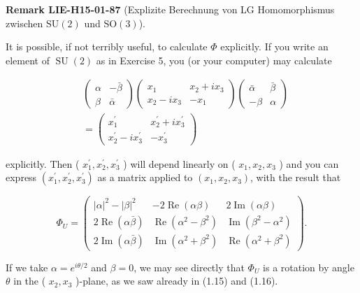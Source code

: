 \documentclass[10pt, letterpaper]{article}
\newcommand{\SO}{\mathrm{SO}}
\newcommand{\SU}{\mathrm{SU}}
\newcommand{\CustomHeading}[3]{%
  \par\medskip\noindent%
  \textbf{#1 #2} \textnormal{(#3)}.\enskip%
}
\newenvironment{REM}[2]{\begin{unitbox}\CustomHeading{Remark}{#1}{#2}}{\end{unitbox}}
\begin{document}
\begin{REM}{LIE-H15-01-87}{Explizite Berechnung von LG Homomorphismus zwischen $\SU(2)$ und $\SO(3)$}
It is possible, if not terribly useful, to calculate $\Phi$ explicitly. If you write an element of $\operatorname{SU}(2)$ as in Exercise 5, you (or your computer) may calculate

$$
\begin{aligned}
& \left(\begin{array}{cc}
\alpha & -\bar{\beta} \\
\beta & \bar{\alpha}
\end{array}\right)\left(\begin{array}{cc}
x_{1} & x_{2}+i x_{3} \\
x_{2}-i x_{3} & -x_{1}
\end{array}\right)\left(\begin{array}{rc}
\bar{\alpha} & \bar{\beta} \\
-\beta & \alpha
\end{array}\right) \\
& =\left(\begin{array}{cc}
x_{1}^{\prime} & x_{2}^{\prime}+i x_{3}^{\prime} \\
x_{2}^{\prime}-i x_{3}^{\prime} & -x_{3}^{\prime}
\end{array}\right)
\end{aligned}
$$

explicitly. Then ( $x_{1}^{\prime}, x_{2}^{\prime}, x_{3}^{\prime}$ ) will depend linearly on ( $x_{1}, x_{2}, x_{3}$ ) and you can express $\left(x_{1}^{\prime}, x_{2}^{\prime}, x_{3}^{\prime}\right)$ as a matrix applied to $\left(x_{1}, x_{2}, x_{3}\right)$, with the result that

$$
\Phi_{U}=\left(\begin{array}{ccc}
|\alpha|^{2}-|\beta|^{2} & -2 \operatorname{Re}(\alpha \beta) & 2 \operatorname{Im}(\alpha \beta) \\
2 \operatorname{Re}(\alpha \bar{\beta}) & \operatorname{Re}\left(\alpha^{2}-\beta^{2}\right) & \operatorname{Im}\left(\beta^{2}-\alpha^{2}\right) \\
2 \operatorname{Im}(\alpha \bar{\beta}) & \operatorname{Im}\left(\alpha^{2}+\beta^{2}\right) & \operatorname{Re}\left(\alpha^{2}+\beta^{2}\right)
\end{array}\right) .
$$

If we take $\alpha=e^{i \theta / 2}$ and $\beta=0$, we may see directly that $\Phi_{U}$ is a rotation by angle $\theta$ in the ( $x_{2}, x_{3}$ )-plane, as we saw already in (1.15) and (1.16).
\end{REM}
\end{document}
